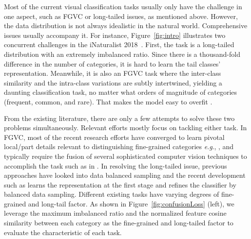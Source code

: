 \documentclass{article}
\newcommand{\eg}{\textit{e}.\textit{g}.}
\begin{document}
Most of the current visual classification tasks usually only have the challenge in one aspect, such as FGVC or long-tailed issues, as mentioned above. However, the data distribution is not always idealistic in the natural world. Comprehensive issues usually accompany it. For instance, Figure~\ref{fig:intro} illustrates two concurrent challenges in the iNaturalist 2018~\citep{van2018inaturalist}. First, the task is a long-tailed distribution with an extremely imbalanced ratio. Since there is a thousand-fold difference in the number of categories, it is hard to learn the tail classes' representation. Meanwhile, it is also an FGVC task where the inter-class similarity and the intra-class variations are subtly intertwined, yielding a daunting classification task, no matter what orders of magnitude of categories (frequent, common, and rare). That makes the model easy to overfit \cite{dubey2018pairwise}.

From the existing literature, there are only a few attempts to solve these two problems simultaneously. Relevant efforts mostly focus on tackling either task. In FGVC, most of the recent research efforts have converged to learn pivotal local/part details relevant to distinguishing fine-grained categories \eg, \cite{fu2017look,yang2018learning,zheng2019looking}, and typically require the fusion of several sophisticated computer vision techniques to accomplish the task such as in \cite{ge2019weakly}. In resolving the long-tailed issue, previous approaches have looked into data balanced sampling \cite{huang2016learning,wang2017learning} and the recent development such as \citet{Kang2020Decoupling} learns the representation at the first stage and refines the classifier by balanced data sampling. Different existing tasks have varying degrees of fine-grained and long-tail factor. As shown in Figure~\ref{fig:confusionLoss} (left), we leverage the maximum imbalanced ratio and the normalized feature cosine similarity between each category as the fine-grained and long-tailed factor to evaluate the characteristic of each task.
\end{document}
